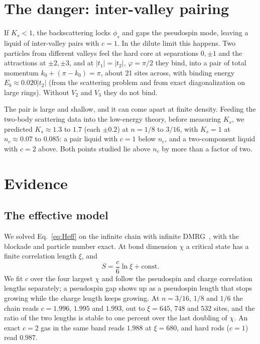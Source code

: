 \documentclass[11pt]{article}
\begin{document}
\section{The danger: inter-valley pairing}

If $K_s<1$, the backscattering locks $\phi_s$ and gaps the pseudospin mode, leaving a liquid of inter-valley pairs with $c=1$. In the dilute limit this happens. Two particles from different valleys feel the hard core at separations $0,\pm1$ and the attractions at $\pm2,\pm3$, and at $|t_1|=|t_2|$, $\varphi=\pi/2$ they bind, into a pair of total momentum $k_0+(\pi-k_0)=\pi$, about 21 sites across, with binding energy $E_b\approx0.020|t_2|$ (from the scattering problem and from exact diagonalization on large rings). Without $V_2$ and $V_3$ they do not bind.

The pair is large and shallow, and it can come apart at finite density. Feeding the two-body scattering data into the low-energy theory, before measuring $K_s$, we predicted $K_s\approx1.3$ to $1.7$ (each $\pm0.2$) at $n=1/8$ to $3/16$, with $K_s=1$ at $n_c\approx0.07$ to $0.085$: a pair liquid with $c=1$ below $n_c$, and a two-component liquid with $c=2$ above. Both points studied lie above $n_c$ by more than a factor of two.

\section{Evidence}

\subsection{The effective model}

We solved Eq.~\eqref{eq:Heff} on the infinite chain with infinite DMRG~\cite{McCulloch}, with the blockade and particle number exact. At bond dimension $\chi$ a critical state has a finite correlation length $\xi$, and~\cite{CC,Tagliacozzo,Pollmann}
\begin{equation}
S=\frac c6\ln\xi+\text{const}.
\label{eq:fes}
\end{equation}
We fit $c$ over the four largest $\chi$ and follow the pseudospin and charge correlation lengths separately; a pseudospin gap shows up as a pseudospin length that stops growing while the charge length keeps growing. At $n=3/16$, $1/8$ and $1/6$ the chain reads $c=1.996$, $1.995$ and $1.993$, out to $\xi=645$, $748$ and $532$ sites, and the ratio of the two lengths is stable to one percent over the last doubling of $\chi$. An exact $c=2$ gas in the same band reads $1.988$ at $\xi=680$, and hard rods ($c=1$) read $0.987$.
\end{document}
